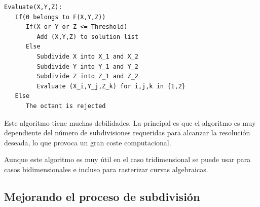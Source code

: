 \begin{verbatim}
Evaluate(X,Y,Z):
   If(0 belongs to F(X,Y,Z))
      If(X or Y or Z <= Threshold)
         Add (X,Y,Z) to solution list
      Else
         Subdivide X into X_1 and X_2
         Subdivide Y into Y_1 and Y_2
         Subdivide Z into Z_1 and Z_2
         Evaluate (X_i,Y_j,Z_k) for i,j,k in {1,2}
   Else
      The octant is rejected
\end{verbatim}

\par Este algoritmo tiene muchas debilidades. La principal es que el algoritmo es muy dependiente del número de subdivisiones requeridas para alcanzar la resolución deseada, lo que provoca un gran coste computacional.
\par Aunque este algoritmo es muy útil en el caso tridimensional se puede usar para casos bidimensionales e incluso para rasterizar curvas algebraicas.\cite{Oliveira00,Taubin94}

\subsection{Mejorando el proceso de subdivisión}

